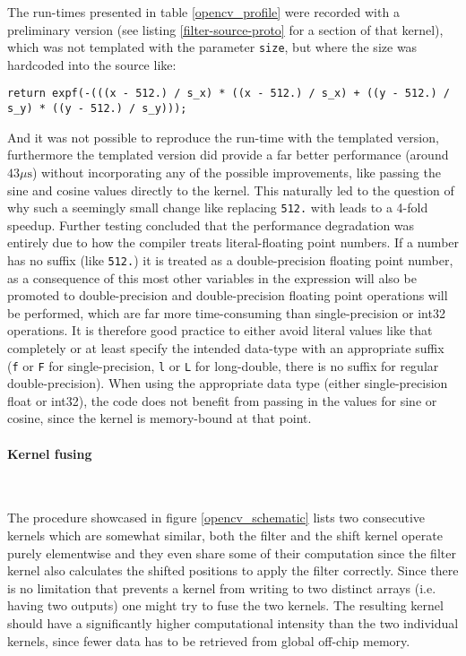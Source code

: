 \documentclass[english,11pt,a4paper,table]{article} %
\begin{document}
The run-times presented in table \ref{opencv_profile} were recorded with a preliminary version (see listing \ref{filter-source-proto} for a section of that kernel), which was not templated with the parameter \texttt{size}, but where the size was hardcoded into the source like:

\begin{verbatim}
return expf(-(((x - 512.) / s_x) * ((x - 512.) / s_x) + ((y - 512.) / s_y) * ((y - 512.) / s_y)));
\end{verbatim}

And it was not possible to reproduce the run-time with the templated version, furthermore the templated version did provide a far better performance (around $43 \mu\text{s}$) without incorporating any of the possible improvements, like passing the sine and cosine values directly to the kernel.
This naturally led to the question of why such a seemingly small change like replacing \texttt{512.} with  leads to a 4-fold speedup.
Further testing concluded that the performance degradation was entirely due to how the compiler treats literal-floating point numbers.
If a number has no suffix (like \texttt{512.}) it is treated as a double-precision floating point number, as a consequence of this most other variables in the expression will also be promoted to double-precision and double-precision floating point operations will be performed, which are far more time-consuming than single-precision or int32 operations.
It is therefore good practice to either avoid literal values like that completely or at least specify the intended data-type with an appropriate suffix (\texttt{f} or \texttt{F} for single-precision, \texttt{l} or \texttt{L} for long-double, there is no suffix for regular double-precision).
When using the appropriate data type (either single-precision float or int32), the code does not benefit from passing in the values for sine or cosine, since the kernel is memory-bound at that point.

\paragraph{Kernel fusing}\mbox{}\\
\label{kernel-fusing}

The procedure showcased in figure \ref{opencv_schematic} lists two consecutive kernels which are somewhat similar, both the filter and the shift kernel operate purely elementwise and they even share some of their computation since the filter kernel also calculates the shifted positions to apply the filter correctly.
Since there is no limitation that prevents a kernel from writing to two distinct arrays (i.e. having two outputs) one might try to fuse the two kernels. 
The resulting kernel should have a significantly higher computational intensity than the two individual kernels, since fewer data has to be retrieved from global off-chip memory.
\end{document}
